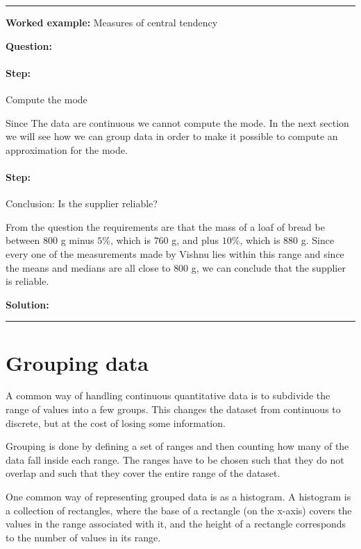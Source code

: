 \documentclass[a4paper,11pt]{report}
\newenvironment{wex}[3]%
{\rule{\linewidth}{0.5mm}
\textbf{Worked example:} #1

\textbf{Question:} #2

\textbf{Solution:} #3}%
{\rule{\linewidth}{0.5mm}}
\newcommand{\westep}[1]{\paragraph{Step:} #1}
\begin{document}
\begin{wex}{Measures of central tendency}
{  \westep{Compute the mode}

  Since The data are continuous we cannot compute the mode. In the next
  section we will see how we can group data in order to make it possible
  to compute an approximation for the mode.

  \westep{Conclusion: Is the supplier reliable?}

  From the question the requirements are that the mass of a loaf of
  bread be between $800$ g minus $5$\%, which is $760$ g, and plus
  $10$\%, which is $880$ g. Since every one of the measurements made
  by Vishnu lies within this range and since the means and medians are
  all close to $800$ g, we can conclude that the supplier is reliable.

}
\end{wex}

\section{Grouping data}
\label{sec:statistics_grouping_data}
A common way of handling continuous quantitative data is to subdivide
the range of values into a few groups. This changes the dataset from
continuous to discrete, but at the cost of losing some information.

Grouping is done by defining a set of ranges and then counting how
many of the data fall inside each range. The ranges have to be chosen
such that they do not overlap and such that they cover the entire
range of the dataset.

One common way of representing grouped data is as a histogram. A
histogram is a collection of rectangles, where the base of a
rectangle (on the x-axis) covers the values in the range associated
with it, and the height of a rectangle corresponds to the number of
values in its range.
\end{document}
